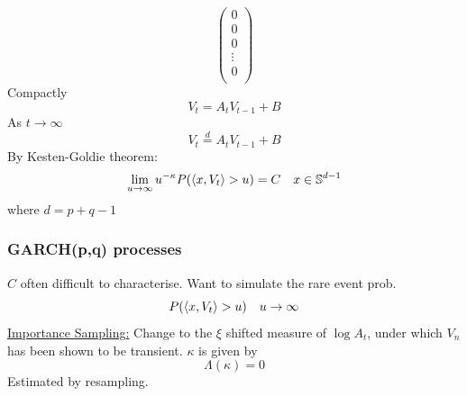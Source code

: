 \documentclass{beamer}
\begin{document}
\begin{frame}
\begin{tiny}
\begin{equation*}
\begin{pmatrix}
        0 \\
        0 \\
        0 \\
        \vdots \\
        0 \\
      \end{pmatrix}
    \end{equation*}
    Compactly
    \[
    V_t = A_t V_{t-1} + B
    \]
    As $t \to \infty$
    \[
    V_t \overset{d}{=} A_t V_{t-1} + B
    \]
    By Kesten-Goldie theorem:
    \[
    \lim_{u \to \infty} u^{-\kappa} P(\langle x, V_t\rangle > u) = C \quad x \in \mathbb S^{d-1}
    \]
    where $d = p + q -1$
  \end{tiny}
\end{frame}

\begin{frame}
  \frametitle{GARCH(p,q) processes}
  $C$ often difficult to characterise. Want to simulate the rare event prob.
  \[
  P(\langle x, V_t\rangle > u) \quad u \to \infty  
  \]
  \underline{Importance Sampling:}
  Change to the $\xi$ shifted measure of $\log A_t$, under which $V_n$ has
  been shown to be transient. $\kappa$ is given by
  \[
  \Lambda(\kappa) = 0
  \]
  Estimated by resampling.
\end{frame}
\end{document}
